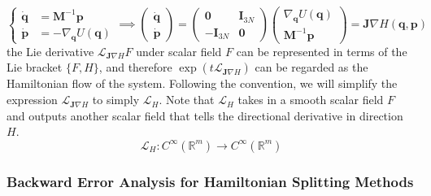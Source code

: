       \begin{equation}
        \begin{cases} \boldsymbol{\dot{q}} & = \mathbf{M}^{-1} \mathbf{p} \\
        \boldsymbol{\dot{p}} & = - \nabla_\mathbf{q} U(\mathbf{q}) \end{cases} \implies \begin{pmatrix} \boldsymbol{\dot{q}} \\ \boldsymbol{\dot{p}} \end{pmatrix} = \begin{pmatrix} \mathbf{0} & \mathbf{I}_{3N} \\ -\mathbf{I}_{3N} & \mathbf{0} \end{pmatrix} \begin{pmatrix} \nabla_\mathbf{q} U (\mathbf{q})\\ \mathbf{M}^{-1} \mathbf{p} \end{pmatrix} = \mathbf{J} \nabla H(\mathbf{q}, \mathbf{p})
      \end{equation}
      the Lie derivative $\mathcal{L}_{\mathbf{J} \nabla H} F$ under scalar field $F$ can be represented in terms of the Lie bracket $\{F, H\}$, and therefore $\exp(t \mathcal{L}_{\mathbf{J} \nabla H})$ can be regarded as the Hamiltonian flow of the system. Following the convention, we will simplify the expression $\mathcal{L}_{\mathbf{J} \nabla H}$ to simply $\mathcal{L}_H$. Note that $\mathcal{L}_H$ takes in a smooth scalar field $F$ and outputs another scalar field that tells the directional derivative in direction $H$. 
      \begin{equation}
        \mathcal{L}_H: C^\infty (\mathbb{R}^m) \longrightarrow C^\infty (\mathbb{R}^m)
      \end{equation}

    \subsubsection{Backward Error Analysis for Hamiltonian Splitting Methods}

